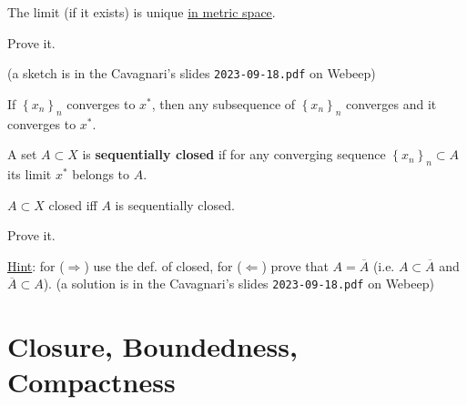 \begin{prp}
The limit (if it exists) is unique \underline{in metric space}.
\end{prp}

\begin{home}
Prove it.

\newline
\newline
\newline
\newline
\newline
\newline
(a sketch is in the Cavagnari's slides \texttt{2023-09-18.pdf} on Webeep)
\end{home}

\begin{prp}
If $\left\{ x_n \right\}_{n}$ converges to $x^*$, then any subsequence of $\left\{ x_n \right\}_{n}$ converges and it converges to $x^*$.
\end{prp}

\begin{defn}
A set $A\subset X$ is \textbf{sequentially closed} if for any converging sequence $\left\{ x_n \right\}_{n}\subset A$ its limit $x^*$ belongs to $A$.
\end{defn}

\begin{prp}
$A\subset X$ closed iff $A$ is sequentially closed.
\end{prp}

\begin{home}
Prove it.

\underline{Hint}: for ($\Rightarrow$) use the def. of closed, for ($\Leftarrow$) prove that $A=\overline{A}$ (i.e. $A\subset\overline{A}$ and $\overline{A}\subset A$).
\newline
\newline
\newline
\newline
\newline
\newline
(a solution is in the Cavagnari's slides \texttt{2023-09-18.pdf} on Webeep)
\end{home}


\newpage

\section{Closure, Boundedness, Compactness} %
\label{sec:closure_boundedness_compactness}

